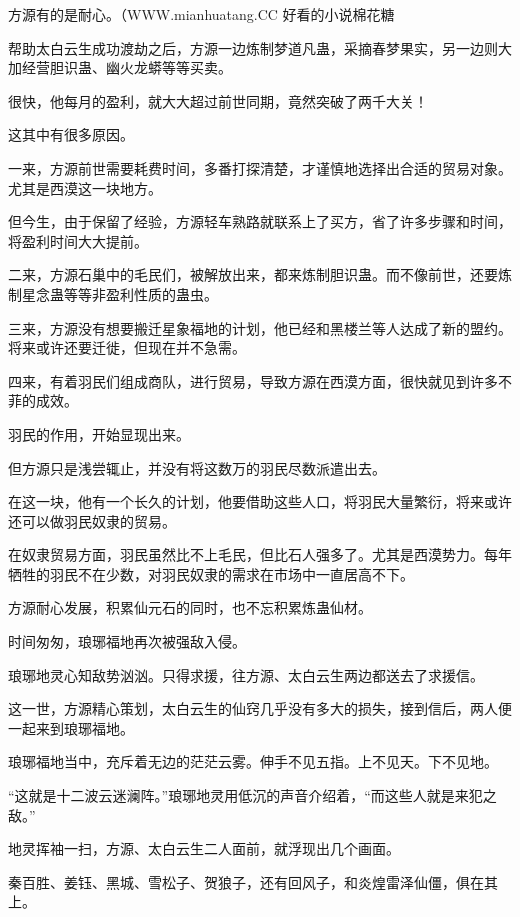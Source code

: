 
\begin{this_body}

方源有的是耐心。（WWW.mianhuatang.CC 好看的小说棉花糖

帮助太白云生成功渡劫之后，方源一边炼制梦道凡蛊，采摘春梦果实，另一边则大加经营胆识蛊、幽火龙蟒等等买卖。

很快，他每月的盈利，就大大超过前世同期，竟然突破了两千大关！

这其中有很多原因。

一来，方源前世需要耗费时间，多番打探清楚，才谨慎地选择出合适的贸易对象。尤其是西漠这一块地方。

但今生，由于保留了经验，方源轻车熟路就联系上了买方，省了许多步骤和时间，将盈利时间大大提前。

二来，方源石巢中的毛民们，被解放出来，都来炼制胆识蛊。而不像前世，还要炼制星念蛊等等非盈利性质的蛊虫。

三来，方源没有想要搬迁星象福地的计划，他已经和黑楼兰等人达成了新的盟约。将来或许还要迁徙，但现在并不急需。

四来，有着羽民们组成商队，进行贸易，导致方源在西漠方面，很快就见到许多不菲的成效。

羽民的作用，开始显现出来。

但方源只是浅尝辄止，并没有将这数万的羽民尽数派遣出去。

在这一块，他有一个长久的计划，他要借助这些人口，将羽民大量繁衍，将来或许还可以做羽民奴隶的贸易。

在奴隶贸易方面，羽民虽然比不上毛民，但比石人强多了。尤其是西漠势力。每年牺牲的羽民不在少数，对羽民奴隶的需求在市场中一直居高不下。

方源耐心发展，积累仙元石的同时，也不忘积累炼蛊仙材。

时间匆匆，琅琊福地再次被强敌入侵。

琅琊地灵心知敌势汹汹。只得求援，往方源、太白云生两边都送去了求援信。

这一世，方源精心策划，太白云生的仙窍几乎没有多大的损失，接到信后，两人便一起来到琅琊福地。

琅琊福地当中，充斥着无边的茫茫云雾。伸手不见五指。上不见天。下不见地。

“这就是十二波云迷澜阵。”琅琊地灵用低沉的声音介绍着，“而这些人就是来犯之敌。”

地灵挥袖一扫，方源、太白云生二人面前，就浮现出几个画面。

秦百胜、姜钰、黑城、雪松子、贺狼子，还有回风子，和炎煌雷泽仙僵，俱在其上。


\end{this_body}
